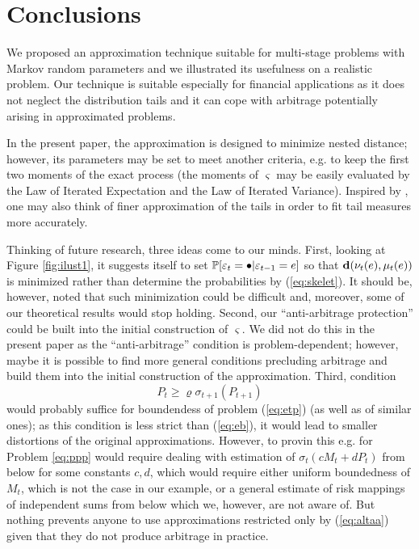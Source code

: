 \documentclass{article}              %
\begin{document}
\section{Conclusions} 
\label{sec:conc}

We proposed an approximation technique suitable for multi-stage problems with Markov random parameters and we illustrated its usefulness on a realistic problem. Our technique is suitable especially for financial applications as it does not neglect the distribution tails and it can cope with arbitrage potentially arising in approximated problems. 

In the present paper, the approximation is designed to minimize nested distance; however, its  parameters may be set to meet another criteria, e.g. to keep the first two moments of the exact process (the moments of $\varsigma$ may be easily evaluated by the Law of Iterated Expectation and the Law of Iterated Variance). Inspired by \cite{kozmik2014evaluating}, one may also think of finer approximation of the tails in order to fit tail measures more accurately. 

Thinking of future research, three ideas come to our minds. First, looking at Figure \ref{fig:ilust1}, it suggests itself to set $\P[\varepsilon_{t}=\bullet|\varepsilon_{t-1}=e]$ so that $\d(\nu_{t}(e),\mu_t(e))$ is minimized rather than determine the probabilities by (\ref{eq:skelet}). It should be, however, noted that such minimization could be difficult and, moreover, some of our theoretical results would stop holding. Second, our ``anti-arbitrage protection'' could be built into the initial construction of $\varsigma$. We did not do this in the present paper as the ``anti-arbitrage'' condition is problem-dependent; however, maybe it is possible to find more general conditions precluding arbitrage and build them into the initial construction of the approximation. Third, condition 
\begin{equation}\label{eq:altaa}
P_t \geq \varrho \sigma_{t+1}(P_{t+1})
\end{equation}
 would probably suffice for boundendess of problem (\ref{eq:etp}) (as well as of similar ones); as this condition is less strict than (\ref{eq:eb}), it would lead to smaller distortions of the original approximations. However, to provin this e.g. for Problem \ref{eq:ppp} would require dealing with estimation of $\sigma_t(cM_t+dP_t)$ from below for some constants $c,d$, which would require either uniform boundedness of $M_t$, which is not the case in our example, or a general estimate of risk mappings of independent sums from below which we, however, are not aware of. But nothing prevents anyone to use approximations restricted only by (\ref{eq:altaa}) given that they do not produce arbitrage in practice.
 
\end{document}
